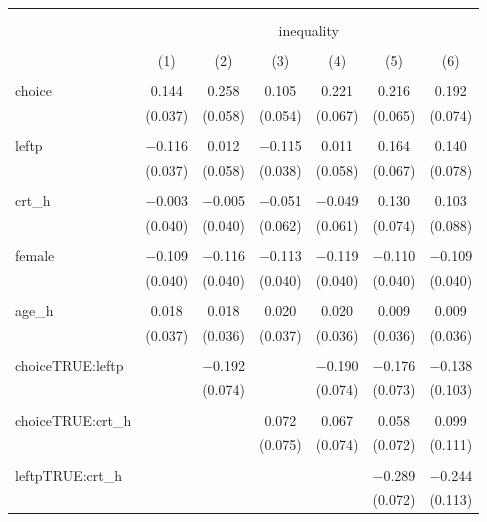 
\begin{table}[!htbp] \centering 
  \caption{} 
  \label{} 
\begin{tabular}{@{\extracolsep{5pt}}lcccccc} 
\\[-1.8ex]\hline 
\hline \\[-1.8ex] 
\\[-1.8ex] & \multicolumn{6}{c}{inequality} \\ 
\\[-1.8ex] & (1) & (2) & (3) & (4) & (5) & (6)\\ 
\hline \\[-1.8ex] 
 choice & 0.144 & 0.258 & 0.105 & 0.221 & 0.216 & 0.192 \\ 
  & (0.037) & (0.058) & (0.054) & (0.067) & (0.065) & (0.074) \\ 
  & & & & & & \\ 
 leftp & $-$0.116 & 0.012 & $-$0.115 & 0.011 & 0.164 & 0.140 \\ 
  & (0.037) & (0.058) & (0.038) & (0.058) & (0.067) & (0.078) \\ 
  & & & & & & \\ 
 crt\_h & $-$0.003 & $-$0.005 & $-$0.051 & $-$0.049 & 0.130 & 0.103 \\ 
  & (0.040) & (0.040) & (0.062) & (0.061) & (0.074) & (0.088) \\ 
  & & & & & & \\ 
 female & $-$0.109 & $-$0.116 & $-$0.113 & $-$0.119 & $-$0.110 & $-$0.109 \\ 
  & (0.040) & (0.040) & (0.040) & (0.040) & (0.040) & (0.040) \\ 
  & & & & & & \\ 
 age\_h & 0.018 & 0.018 & 0.020 & 0.020 & 0.009 & 0.009 \\ 
  & (0.037) & (0.036) & (0.037) & (0.036) & (0.036) & (0.036) \\ 
  & & & & & & \\ 
 choiceTRUE:leftp &  & $-$0.192 &  & $-$0.190 & $-$0.176 & $-$0.138 \\ 
  &  & (0.074) &  & (0.074) & (0.073) & (0.103) \\ 
  & & & & & & \\ 
 choiceTRUE:crt\_h &  &  & 0.072 & 0.067 & 0.058 & 0.099 \\ 
  &  &  & (0.075) & (0.074) & (0.072) & (0.111) \\ 
  & & & & & & \\ 
 leftpTRUE:crt\_h &  &  &  &  & $-$0.289 & $-$0.244 \\ 
  &  &  &  &  & (0.072) & (0.113) \\ 

\end{tabular}
\end{table}
